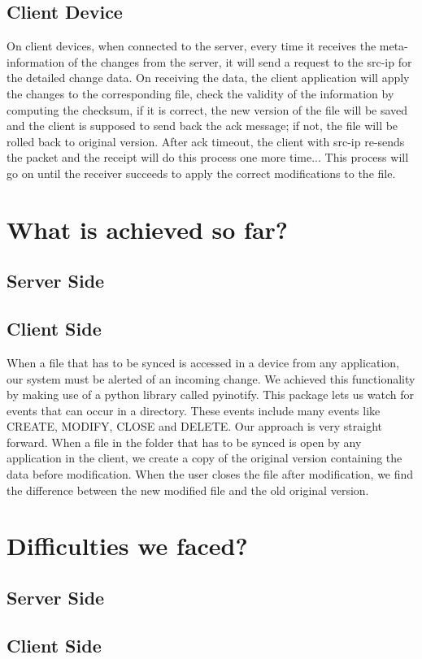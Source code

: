 \documentclass[paper=a4, fontsize=11pt]{scrartcl}
\numberwithin{equation}{section}		%
\numberwithin{figure}{section}			%
\numberwithin{table}{section}				%
\begin{document}
\subsection{Client Device}
On client devices, when connected to the server, every time it receives the meta-information of the changes from the server, it will send a request to the src-ip for the detailed change data. On receiving the data, the client application will apply the changes to the corresponding file, check the validity of the information by computing the checksum, if it is correct, the new version of the file will be saved and the client is supposed to send back the ack message; if not, the file will be rolled back to original version. After ack timeout, the client with src-ip re-sends the packet and the receipt will do this process one more time... This process will go on until the receiver succeeds to apply the correct modifications to the file. 
\section{What is achieved so far?}
\subsection{Server Side}
\subsection{Client Side}
When a file that has to be synced is accessed in a device from any application, our system must be alerted of an incoming change. We achieved this functionality by making use of a python library called pyinotify. This package lets us watch for events that can occur in a directory. These events include many events like CREATE, MODIFY, CLOSE and DELETE. Our approach is very straight forward. When a file in the folder that has to be synced is open by any application in the client, we create a copy of the original version containing the data before modification. When the user closes the file after modification, we find the difference between the new modified file and the old original version.
\section{Difficulties we faced?}
\subsection{Server Side}
\subsection{Client Side}
\end{document}
